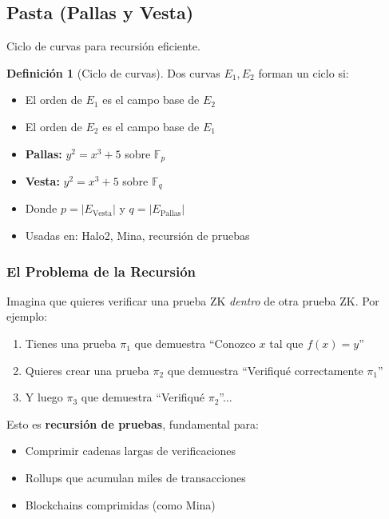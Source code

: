 \documentclass[11pt,a4paper,twoside,openright]{book}
\theoremstyle{definition}
\newtheorem{definition}{Definición}[chapter]
\theoremstyle{plain}
\theoremstyle{remark}
\newcommand{\Fp}{\mathbb{F}_p}
\begin{document}
\subsection{Pasta (Pallas y Vesta)}

Ciclo de curvas para recursión eficiente.

\begin{definition}[Ciclo de curvas]
Dos curvas $E_1, E_2$ forman un ciclo si:
\begin{itemize}
    \item El orden de $E_1$ es el campo base de $E_2$
    \item El orden de $E_2$ es el campo base de $E_1$
\end{itemize}
\end{definition}

\begin{itemize}
    \item \textbf{Pallas:} $y^2 = x^3 + 5$ sobre $\Fp$
    \item \textbf{Vesta:} $y^2 = x^3 + 5$ sobre $\mathbb{F}_q$
    \item Donde $p = |E_{\text{Vesta}}|$ y $q = |E_{\text{Pallas}}|$
    \item Usadas en: Halo2, Mina, recursión de pruebas
\end{itemize}

\subsubsection{El Problema de la Recursión}

\begin{intuicion}
Imagina que quieres verificar una prueba ZK \textit{dentro} de otra prueba ZK. Por ejemplo:
\begin{enumerate}
    \item Tienes una prueba $\pi_1$ que demuestra ``Conozco $x$ tal que $f(x) = y$''
    \item Quieres crear una prueba $\pi_2$ que demuestra ``Verifiqué correctamente $\pi_1$''
    \item Y luego $\pi_3$ que demuestra ``Verifiqué $\pi_2$''...
\end{enumerate}

Esto es \textbf{recursión de pruebas}, fundamental para:
\begin{itemize}
    \item Comprimir cadenas largas de verificaciones
    \item Rollups que acumulan miles de transacciones
    \item Blockchains comprimidas (como Mina)
\end{itemize}
\end{intuicion}
\end{document}
